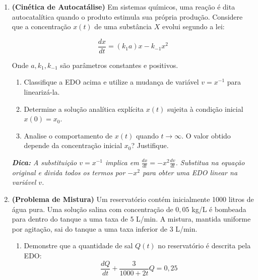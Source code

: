 \documentclass[a4paper,
11pt,  reqno]{amsart}
\begin{document}
\begin{enumerate}
    \medskip
    
    \textit{\textbf{Dica:} Ao realizar a mudança de variável, utilize a regra da cadeia para encontrar $\frac{du}{dt}$ em termos de $N$ e $\frac{dN}{dt}$. Note que $\frac{d}{dt}[\ln(bN)] = \frac{1}{bN} \cdot b \frac{dN}{dt} = \frac{1}{N} \frac{dN}{dt}$.}

    \medskip

\item \textbf{(Cinética de Autocatálise)} Em sistemas químicos, uma reação é dita autocatalítica quando o produto estimula sua própria produção. Considere que a concentração $x(t)$ de uma substância $X$ evolui segundo a lei:
    
    \begin{equation*}
        \frac{dx}{dt} = (k_1 a)x - k_{-1} x^2
    \end{equation*}
    
    Onde $a, k_1, k_{-1}$ são parâmetros constantes e positivos.
    
    \begin{enumerate}
        \item Classifique a EDO acima e utilize a mudança de variável $v = x^{-1}$ para linearizá-la.
        \item Determine a solução analítica explícita $x(t)$ sujeita à condição inicial $x(0) = x_0$.
        \item Analise o comportamento de $x(t)$ quando $t \to \infty$. O valor obtido depende da concentração inicial $x_0$? Justifique.
    \end{enumerate}

    \medskip
    
    \textit{\textbf{Dica:} A substituição $v = x^{-1}$ implica em $\frac{dx}{dt} = -x^2 \frac{dv}{dt}$. Substitua na equação original e divida todos os termos por $-x^2$ para obter uma EDO linear na variável $v$.}

    \medskip

\item \textbf{(Problema de Mistura)} Um reservatório contém inicialmente 1000 litros de água pura. Uma solução salina com concentração de $0,05$ kg/L é bombeada para dentro do tanque a uma taxa de $5$ L/min. A mistura, mantida uniforme por agitação, sai do tanque a uma taxa inferior de $3$ L/min.

\begin{enumerate}
    \item Demonstre que a quantidade de sal $Q(t)$ no reservatório é descrita pela EDO:
    \begin{equation*}
        \frac{dQ}{dt} + \frac{3}{1000 + 2t}Q = 0,25
    \end{equation*}
    

\end{enumerate}
\end{enumerate}
\end{document}
